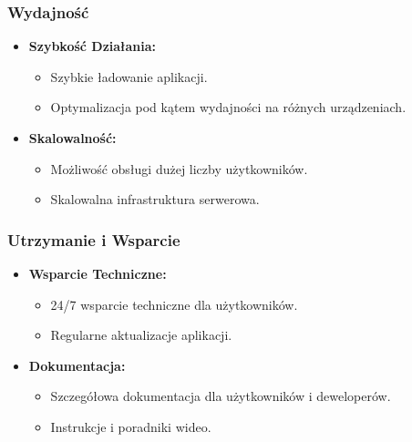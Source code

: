 \documentclass[a4paper,12pt]{article}
\begin{document}
\subsubsection{Wydajność}
\begin{itemize}
    \item \textbf{Szybkość Działania:}
    \begin{itemize}
        \item Szybkie ładowanie aplikacji.
        \item Optymalizacja pod kątem wydajności na różnych urządzeniach.
    \end{itemize}
    \item \textbf{Skalowalność:}
    \begin{itemize}
        \item Możliwość obsługi dużej liczby użytkowników.
        \item Skalowalna infrastruktura serwerowa.
    \end{itemize}
\end{itemize}

\subsubsection{Utrzymanie i Wsparcie}
\begin{itemize}
    \item \textbf{Wsparcie Techniczne:}
    \begin{itemize}
        \item 24/7 wsparcie techniczne dla użytkowników.
        \item Regularne aktualizacje aplikacji.
    \end{itemize}
    \item \textbf{Dokumentacja:}
    \begin{itemize}
        \item Szczegółowa dokumentacja dla użytkowników i deweloperów.
        \item Instrukcje i poradniki wideo.
    \end{itemize}
\end{itemize}
\end{document}
